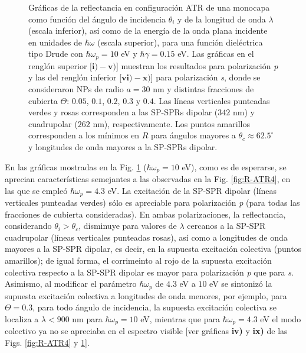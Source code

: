 \begin{figure}[b!]
\vspace*{-.5em}
	\caption{Gráficas de la reflectancia en configuración ATR de una monocapa como función del ángulo de incidencia $\theta_i$ y de la longitud de onda $\lambda$ (escala inferior), así como de la energía de la onda plana incidente en unidades de $\hbar\omega$ (escala superior), para una función dieléctrica tipo Drude con $\hbar\omega_p=10$ eV  y  $\hbar\gamma=0. 15$ eV.  Las gráficas   en el renglón superior [$\mathbf{i)-v)}$] muestran los resultados  para  polarización \emph{p} y las del renglón inferior  [$\mathbf{vi)-x)}$] para polarización  \emph{s}, donde se consideraron NPs de radio $a=30$ nm y distintas fracciones de cubierta $\Theta$: $0. 05$, $0. 1$, $0. 2$, $0. 3$ y $0. 4$. Las líneas verticales punteadas verdes y rosas corresponden a las SP-SPRs dipolar ($342$ nm) y cuadrupolar ($262$ nm), respectivamente.  Los puntos amarillos corresponden a los mínimos en $R$ para ángulos mayores a $\theta_c\approx 62.5^\circ$ y longitudes de onda mayores a la SP-SPRs dipolar. }	\label{fig:R-ATR10}	
	\end{figure}		
	
En las gráficas mostradas en la Fig. \ref{fig:R-ATR10} ($\hbar\omega_p = 10$ eV), como es de esperarse, se aprecian características semejantes a las observadas en la Fig. \ref{fig:R-ATR4}, en las que se empleó $\hbar\omega_p = 4.3$ eV. La excitación de la SP-SPR dipolar (líneas verticales punteadas verdes) sólo es apreciable para polarización \emph{p} (para todas las fracciones de cubierta consideradas). En ambas polarizaciones, la reflectancia, considerando $\theta_i>\theta_c$, disminuye para valores de $\lambda$ cercanos a la SP-SPR cuadrupolar (líneas verticales punteadas rosas), así como a longitudes de onda mayores a la SP-SPR dipolar, es decir, en la supuesta excitación colectiva  (puntos amarillos); de igual forma, el corrimeinto al rojo de la supuesta excitación colectiva respecto a la SP-SPR dipolar es mayor para polarización \emph{p} que para \emph{s}.  Asimismo, al modificar el parámetro $\hbar\omega_p$ de $4.3$ eV a $10$ eV se sintonizó la supuesta excitación colectiva a longitudes de onda menores, por ejemplo, para $\Theta = 0.3$, para todo ángulo de incidencia, la supuesta excitación colectiva se localiza a $\lambda<900$ nm para $\hbar\omega_p=10$ eV, mientras que para $\hbar\omega_p=4.3$ eV el modo colectivo ya no se apreciaba en el espectro visible [ver gráficas \textbf{iv)} y \textbf{ix)} de las Figs. \ref{fig:R-ATR4} y \ref{fig:R-ATR10}].

